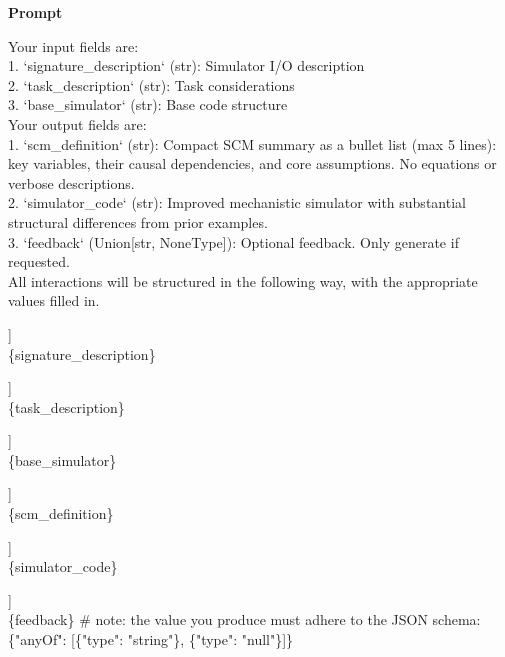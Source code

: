 \noindent\textbf{Prompt}\par\smallskip

\begin{tcolorbox}[
  breakable, enhanced,
  title={System},
  colback=SystemBg, colframe=SystemFrame,
  coltitle=white, fonttitle=\bfseries\small,
  arc=2mm, boxrule=1pt,
  before upper={\small\setlength{\parindent}{0pt}\setlength{\parskip}{2pt}},
]
Your input fields are:\\{}
1. `signature\_description` (str): Simulator I/O description\\{}
2. `task\_description` (str): Task considerations\\{}
3. `base\_simulator` (str): Base code structure\\{}
Your output fields are:\\{}
1. `scm\_definition` (str): Compact SCM summary as a bullet list (max 5 lines): key variables, their causal dependencies, and core assumptions. No equations or verbose descriptions.\\{}
2. `simulator\_code` (str): Improved mechanistic simulator with substantial structural differences from prior examples.\\{}
3. `feedback` (Union[str, NoneType]): Optional feedback. Only generate if requested.\\{}
All interactions will be structured in the following way, with the appropriate values filled in.
\smallskip
\par\noindent [[ \#\# signature\_description \#\# ]]\\
\noindent
\{signature\_description\}
\smallskip
\par\noindent [[ \#\# task\_description \#\# ]]\\
\noindent
\{task\_description\}
\smallskip
\par\noindent [[ \#\# base\_simulator \#\# ]]\\
\noindent
\{base\_simulator\}
\smallskip
\par\noindent [[ \#\# scm\_definition \#\# ]]\\
\noindent
\{scm\_definition\}
\smallskip
\par\noindent [[ \#\# simulator\_code \#\# ]]\\
\noindent
\{simulator\_code\}
\smallskip
\par\noindent [[ \#\# feedback \#\# ]]\\
\noindent
\{feedback\}        \# note: the value you produce must adhere to the JSON schema: \{"anyOf": [\{"type": "string"\}, \{"type": "null"\}]\}
\smallskip

\end{tcolorbox}
